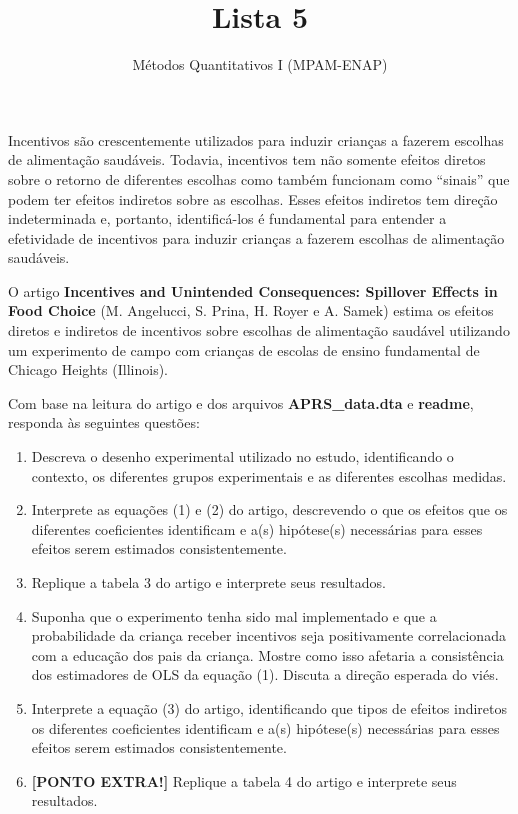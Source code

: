 \documentclass[a4paper, 12pt, final]{article}
\title{\textbf{Lista 5}}
\author{Métodos Quantitativos I (MPAM-ENAP)}
\date{}
\begin{document}
\maketitle

Incentivos são crescentemente utilizados para induzir crianças a fazerem escolhas de alimentação saudáveis. Todavia, incentivos tem não somente efeitos diretos sobre o retorno de diferentes escolhas como também funcionam como ``sinais'' que podem ter efeitos indiretos sobre as escolhas. Esses efeitos indiretos tem direção indeterminada e, portanto, identificá-los é fundamental para entender a efetividade de incentivos para induzir crianças a fazerem escolhas de alimentação saudáveis.      

O artigo \textbf{Incentives and Unintended Consequences: Spillover Effects in Food Choice} (M. Angelucci, S. Prina, H. Royer e A. Samek) estima os efeitos diretos e indiretos de incentivos sobre escolhas de alimentação saudável utilizando um experimento de campo com crianças de escolas de ensino fundamental de Chicago Heights (Illinois). 

Com base na leitura do artigo e dos arquivos \textbf{APRS\_data.dta} e \textbf{readme}, responda às seguintes questões:   

\begin{enumerate}

\item Descreva o desenho experimental utilizado no estudo, identificando o contexto, os diferentes grupos experimentais e as diferentes escolhas medidas.

\item Interprete as equações (1) e (2) do artigo, descrevendo o que os efeitos que os diferentes coeficientes identificam e a(s) hipótese(s) necessárias para esses efeitos serem estimados consistentemente.

\item Replique a tabela 3 do artigo e interprete seus resultados.

\item Suponha que o experimento tenha sido mal implementado e que a probabilidade da criança receber incentivos seja positivamente correlacionada com a educação dos pais da criança. Mostre como isso afetaria a consistência dos estimadores de OLS da equação (1). Discuta a direção esperada do viés. 

\item Interprete a equação (3) do artigo, identificando que tipos de efeitos indiretos os diferentes coeficientes identificam e a(s) hipótese(s) necessárias para esses efeitos serem estimados consistentemente.

\item \textbf{[PONTO EXTRA!]} Replique a tabela 4 do artigo e interprete seus resultados. 



\end{enumerate}
\end{document}
